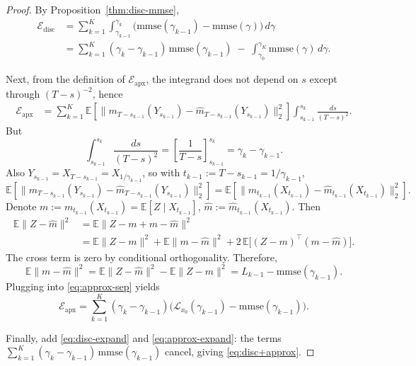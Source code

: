 \documentclass[11pt]{article}
\theoremstyle{definition}
\newcommand{\E}{\mathbb{E}}
\numberwithin{equation}{section}
\begin{document}
\begin{proof}
By Proposition~\ref{thm:disc-mmse},
\begin{align}
\mathcal E_{\mathrm{disc}}
&=\sum_{k=1}^K \int_{\gamma_{k-1}}^{\gamma_k}
\big(\mathrm{mmse}(\gamma_{k-1})-\mathrm{mmse}(\gamma)\big)\,d\gamma \nonumber\\
&=\sum_{k=1}^K(\gamma_k-\gamma_{k-1})\,\mathrm{mmse}(\gamma_{k-1})
\;-\;\int_{\gamma_0}^{\gamma_K}\mathrm{mmse}(\gamma)\,d\gamma.
\label{eq:disc-expand}
\end{align}

Next, from the definition of $\mathcal E_{\mathrm{apx}}$,
the integrand does not depend on $s$ except through $(T-s)^{-2}$, hence
\begin{align}
\mathcal E_{\mathrm{apx}}
&=\sum_{k=1}^K
\E\!\left[
\big\|m_{T-s_{k-1}}(Y_{s_{k-1}})-\hat m_{T-s_{k-1}}(Y_{s_{k-1}})\big\|_2^2
\right]
\int_{s_{k-1}}^{s_k}\frac{ds}{(T-s)^2}.
\label{eq:approx-sep}
\end{align}
But
\[
\int_{s_{k-1}}^{s_k}\frac{ds}{(T-s)^2}
=\left[\frac{1}{T-s}\right]_{s_{k-1}}^{s_k}
=\gamma_k-\gamma_{k-1}.
\]
Also $Y_{s_{k-1}}=X_{T-s_{k-1}}=X_{1/\gamma_{k-1}}$, so with $t_{k-1}:=T-s_{k-1}=1/\gamma_{k-1}$,
\[
\E\!\left[
\big\|m_{T-s_{k-1}}(Y_{s_{k-1}})-\hat m_{T-s_{k-1}}(Y_{s_{k-1}})\big\|_2^2
\right]
=
\E\!\left[\big\|m_{t_{k-1}}(X_{t_{k-1}})-\hat m_{t_{k-1}}(X_{t_{k-1}})\big\|_2^2\right].
\]
Denote $m:=m_{t_{k-1}}(X_{t_{k-1}})=\E[Z\mid X_{t_{k-1}}]$, $\hat m:=\hat m_{t_{k-1}}(X_{t_{k-1}})$. Then
\begin{align*}
\E\|Z-\hat m\|^2
&=\E\|Z-m+m-\hat m\|^2 \\
&=\E\|Z-m\|^2+\E\|m-\hat m\|^2
+2\,\E\!\big[(Z-m)^\top(m-\hat m)\big].
\end{align*}
The cross term is zero by conditional orthogonality.
Therefore,
\[
\E\|m-\hat m\|^2=\E\|Z-\hat m\|^2-\E\|Z-m\|^2
=L_{k-1}-\mathrm{mmse}(\gamma_{k-1}).
\]
Plugging into \eqref{eq:approx-sep} yields
\begin{equation}
\label{eq:approx-expand}
\mathcal E_{\mathrm{apx}}
=\sum_{k=1}^K(\gamma_k-\gamma_{k-1})\Big(\mathcal L_{x_0}(\gamma_{k-1})-\mathrm{mmse}(\gamma_{k-1})\Big).
\end{equation}

Finally, add \eqref{eq:disc-expand} and \eqref{eq:approx-expand}: the terms
$\sum_{k=1}^K(\gamma_k-\gamma_{k-1})\,\mathrm{mmse}(\gamma_{k-1})$ cancel, giving \eqref{eq:disc+approx}.
\end{proof}

\end{document}
